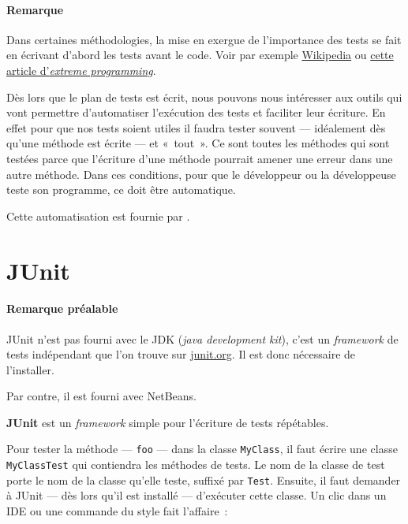 \paragraph{Remarque} Dans certaines méthodologies, la mise en exergue de l'importance des tests se fait en écrivant d'abord les tests avant le code.
Voir par exemple \href{https://fr.wikipedia.org/wiki/Test_driven_development}{Wikipedia} ou \href{http://www.extremeprogramming.org/rules/testfirst.html}{cette article d'\textit{extreme programming}}\cite{testfirst}. 

Dès lors que le plan de tests est écrit, nous pouvons nous intéresser aux outils
qui vont permettre d'automatiser l'exécution des tests et faciliter leur
écriture.  En effet pour que nos tests soient utiles il faudra tester souvent
— idéalement dès qu'une méthode est écrite — et «~tout~». Ce sont toutes les
méthodes qui sont testées parce que l'écriture d'une méthode pourrait amener une
erreur dans une autre méthode. Dans ces conditions, pour que le développeur ou
la développeuse teste son programme, ce doit être automatique.  

Cette automatisation est fournie par .



\section{JUnit}

\paragraph{Remarque préalable} JUnit n'est pas fourni avec le JDK (\textit{java
development kit}), c'est un \textit{framework} de tests indépendant que l'on
trouve sur \url{junit.org}. Il est donc nécessaire de l'installer. 

Par contre, il est fourni avec NetBeans. 

\textbf{JUnit} est un \textit{framework} simple pour l'écriture de tests
répétables. 

Pour tester la méthode — \texttt{foo} — dans la classe \texttt{MyClass}, il faut
écrire une classe \texttt{MyClassTest} qui contiendra les méthodes de tests.  Le
nom de la classe de test porte le nom de la classe qu'elle teste, suffixé par
\texttt{Test}. Ensuite, il faut demander à JUnit — dès lors qu'il est installé
— d'exécuter cette classe. Un clic dans un IDE ou une commande du style fait
l'affaire~:

